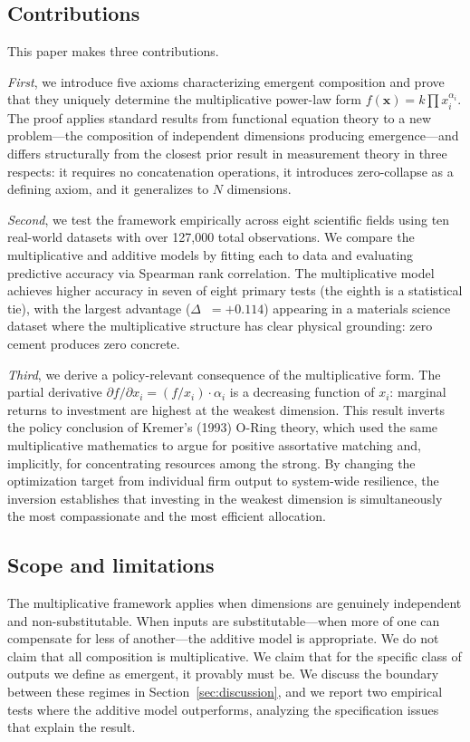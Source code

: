 \documentclass[12pt, a4paper]{article}
\theoremstyle{definition}
\theoremstyle{remark}
\DeclareMathOperator{\Spearman}{\rho_s}
\begin{document}
\subsection{Contributions}

This paper makes three contributions.

\textit{First}, we introduce five axioms characterizing emergent composition and prove that they uniquely determine the multiplicative power-law form $f(\mathbf{x}) = k \prod x_i^{\alpha_i}$. The proof applies standard results from functional equation theory \cite{aczel1966} to a new problem---the composition of independent dimensions producing emergence---and differs structurally from the closest prior result in measurement theory \cite{luce1965} in three respects: it requires no concatenation operations, it introduces zero-collapse as a defining axiom, and it generalizes to $N$ dimensions.

\textit{Second}, we test the framework empirically across eight scientific fields using ten real-world datasets with over 127,000 total observations. We compare the multiplicative and additive models by fitting each to data and evaluating predictive accuracy via Spearman rank correlation. The multiplicative model achieves higher accuracy in seven of eight primary tests (the eighth is a statistical tie), with the largest advantage ($\Delta\Spearman = +0.114$) appearing in a materials science dataset where the multiplicative structure has clear physical grounding: zero cement produces zero concrete.

\textit{Third}, we derive a policy-relevant consequence of the multiplicative form. The partial derivative $\partial f / \partial x_i = (f / x_i) \cdot \alpha_i$ is a decreasing function of $x_i$: marginal returns to investment are highest at the weakest dimension. This result inverts the policy conclusion of Kremer's (1993) O-Ring theory, which used the same multiplicative mathematics to argue for positive assortative matching and, implicitly, for concentrating resources among the strong. By changing the optimization target from individual firm output to system-wide resilience, the inversion establishes that investing in the weakest dimension is simultaneously the most compassionate and the most efficient allocation.

\subsection{Scope and limitations}

The multiplicative framework applies when dimensions are genuinely independent and non-substitutable. When inputs are substitutable---when more of one can compensate for less of another---the additive model is appropriate. We do not claim that all composition is multiplicative. We claim that for the specific class of outputs we define as emergent, it provably must be. We discuss the boundary between these regimes in Section~\ref{sec:discussion}, and we report two empirical tests where the additive model outperforms, analyzing the specification issues that explain the result.
\end{document}
